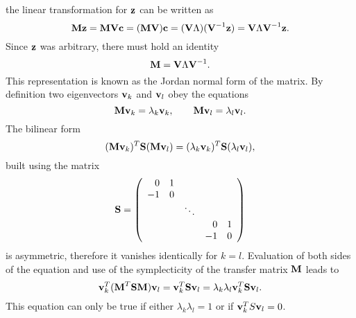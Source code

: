 the linear transformation for $\bold{z}$ can be written as
\begin{equation}
\bold{M} \bold{z} = \bold{M} \bold{V} \bold{c} =
(\bold{M} \bold{V}) \bold{c} =
(\bold{V} \Lambda) (\bold{V}^{-1} \bold{z}) =
\bold{V} \Lambda \bold{V}^{-1} \bold{z}.
\end{equation}
Since $\bold{z}$ was arbitrary, there must hold an identity
\begin{equation}
\bold{M} = \bold{V} \Lambda \bold{V}^{-1}.
\end{equation}
This representation is known as the Jordan normal form of the matrix.
By definition two eigenvectors $\bold{v}_k$ and $\bold{v}_l$ obey
the equations
\begin{equation}
\bold{M} \bold{v}_k = \lambda_k \bold{v}_k, \qquad
\bold{M} \bold{v}_l = \lambda_l \bold{v}_l.
\end{equation}
The bilinear form
\begin{equation}
(\bold{M} \bold{v}_k)^T \bold{S} (\bold{M} \bold{v}_l) =
(\lambda_k \bold{v}_k)^T \bold{S} (\lambda_l \bold{v}_l),
\end{equation}
built using the matrix
\begin{equation}
\bold{S} = \left( \begin{array}{rrrrr}
0 & 1 & & & \\ -1 & 0 & & & \\ & & \ddots & & \\
 & & & 0 & 1 \\ & & & -1 & 0
\end{array} \right)
\end{equation}
is asymmetric, therefore it vanishes identically for $k=l$.
Evaluation of both sides of the equation and use of the symplecticity of
the transfer matrix $\bold{M}$ leads to
\begin{equation}
\bold{v}_k^T (\bold{M}^T \bold{S} \bold{M}) \bold{v}_l =
\bold{v}_k^T \bold{S} \bold{v}_l =
\lambda_k \lambda_l \bold{v}_k^T \bold{S} \bold{v}_l.
\label{form}
\end{equation}
This equation can only be true if either $\lambda_k \lambda_l = 1$
or if $\bold{v}_k^T S \bold{v}_l = 0$.
 
